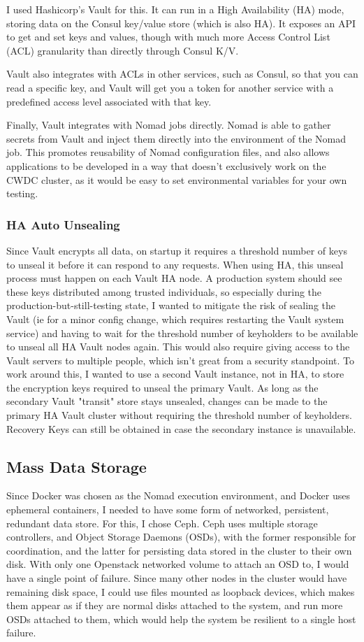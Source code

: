 \documentclass{article}
\begin{document}
I used Hashicorp's Vault for this. It can run in a High Availability (HA) mode, storing data on the Consul key/value store (which is also HA). It exposes an API to get and set keys and values, though with much more Access Control List (ACL) granularity than directly through Consul K/V.

Vault also integrates with ACLs in other services, such as Consul, so that you can read a specific key, and Vault will get you a token for another service with a predefined access level associated with that key. 

Finally, Vault integrates with Nomad jobs directly. Nomad is able to gather secrets from Vault and inject them directly into the environment of the Nomad job. This promotes reusability of Nomad configuration files, and also allows applications to be developed in a way that doesn't exclusively work on the CWDC cluster, as it would be easy to set environmental variables for your own testing.

\subsubsection{HA Auto Unsealing}
Since Vault encrypts all data, on startup it requires a threshold number of keys to unseal it before it can respond to any requests. When using HA, this unseal process must happen on each Vault HA node. A production system should see these keys distributed among trusted individuals, so especially during the production-but-still-testing state, I wanted to mitigate the risk of sealing the Vault (ie for a minor config change, which requires restarting the Vault system service) and having to wait for the threshold number of keyholders to be available to unseal all HA Vault nodes again. This would also require giving access to the Vault servers to multiple people, which isn't great from a security standpoint. To work around this, I wanted to use a second Vault instance, not in HA, to store the encryption keys required to unseal the primary Vault. As long as the secondary Vault "transit" store stays unsealed, changes can be made to the primary HA Vault cluster without requiring the threshold number of keyholders. Recovery Keys can still be obtained in case the secondary instance is unavailable.


\subsection{Mass Data Storage}
Since Docker was chosen as the Nomad execution environment, and Docker uses ephemeral containers, I needed to have some form of networked, persistent, redundant data store. For this, I chose Ceph. Ceph uses multiple storage controllers, and Object Storage Daemons (OSDs), with the former responsible for coordination, and the latter for persisting data stored in the cluster to their own disk. With only one Openstack networked volume to attach an OSD to, I would have a single point of failure. Since many other nodes in the cluster would have remaining disk space, I could use files mounted as loopback devices, which makes them appear as if they are normal disks attached to the system, and run more OSDs attached to them, which would help the system be resilient to a single host failure. 
\end{document}
